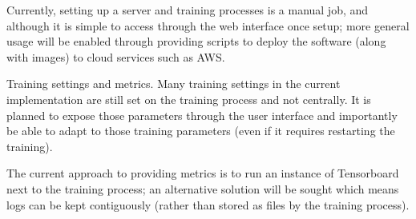 Currently, setting up a server and training processes is a manual job, and although it is simple to access through the web interface once setup; more general usage will be enabled through providing scripts to deploy the software (along with images) to cloud services such as \gls{AWS}. 

Training settings and metrics. Many training settings in the current implementation are still set on the training process and not centrally. It is planned to expose those parameters through the user interface and importantly be able to adapt to those training parameters (even if it requires restarting the training).

The current approach to providing metrics is to run an instance of Tensorboard next to the training process; an alternative solution will be sought which means logs can be kept contiguously (rather than stored as files by the training process).

